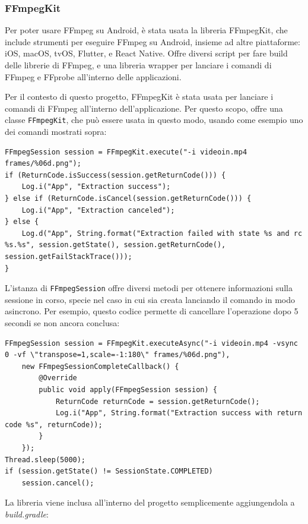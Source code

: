 \subsubsection*{FFmpegKit}

Per poter usare FFmpeg su Android, è stata usata la libreria FFmpegKit, che include strumenti
per eseguire FFmpeg su Android, insieme ad altre piattaforme: iOS, macOS, tvOS, Flutter, e 
React Native. Offre diversi script per fare build delle librerie di FFmpeg, e una libreria 
wrapper per lanciare i comandi di FFmpeg e FFprobe all'interno delle applicazioni. 

Per il contesto di questo progetto, FFmpegKit è stata usata per lanciare i comandi di FFmpeg
all'interno dell'applicazione. Per questo scopo, offre una classe \texttt{FFmpegKit}, che può
essere usata in questo modo, usando come esempio uno dei comandi mostrati sopra:

\begin{lstlisting}
FFmpegSession session = FFmpegKit.execute("-i videoin.mp4 frames/%06d.png");
if (ReturnCode.isSuccess(session.getReturnCode())) {
    Log.i("App", "Extraction success");
} else if (ReturnCode.isCancel(session.getReturnCode())) {
    Log.i("App", "Extraction canceled");
} else {
    Log.d("App", String.format("Extraction failed with state %s and rc %s.%s", session.getState(), session.getReturnCode(), session.getFailStackTrace()));
}
\end{lstlisting}

L'istanza di \texttt{FFmpegSession} offre diversi metodi per ottenere informazioni sulla sessione
in corso, specie nel caso in cui sia creata lanciando il comando in modo asincrono. Per esempio,
questo codice permette di cancellare l'operazione dopo 5 secondi se non ancora conclusa:

\begin{lstlisting}
FFmpegSession session = FFmpegKit.executeAsync("-i videoin.mp4 -vsync 0 -vf \"transpose=1,scale=-1:180\" frames/%06d.png"),
    new FFmpegSessionCompleteCallback() {
        @Override
        public void apply(FFmpegSession session) {
            ReturnCode returnCode = session.getReturnCode();
            Log.i("App", String.format("Extraction success with return code %s", returnCode));
        }
    });
Thread.sleep(5000);
if (session.getState() != SessionState.COMPLETED)
    session.cancel();
\end{lstlisting}

La libreria viene inclusa all'interno del progetto semplicemente aggiungendola a 
\emph{build.gradle}:

